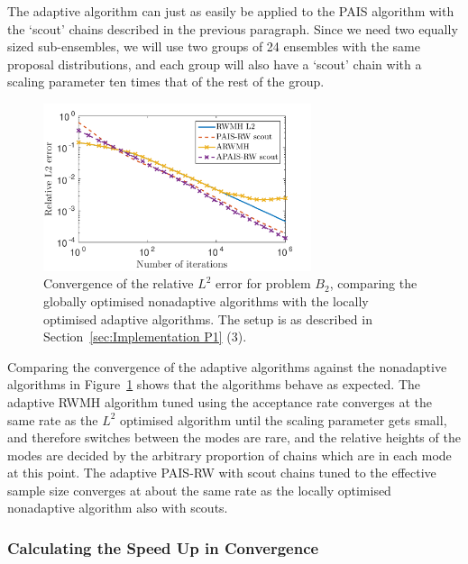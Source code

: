 \documentclass[final]{siamltex}
\begin{document}
The adaptive algorithm can just as easily be applied to the PAIS algorithm with the `scout' chains described in the previous paragraph. Since we need two equally sized sub-ensembles, we will use two groups of 24 ensembles with the same proposal distributions, and each group will also have a `scout' chain with a scaling parameter ten times that of the rest of the group.

\begin{figure}[htb]
\begin{center}
\includegraphics[width=0.7\textwidth]{"figures/BM2_AL2"}
\caption{Convergence of the relative $L^2$ error for problem $B_2$, comparing the globally optimised nonadaptive algorithms with the locally optimised adaptive algorithms. The setup is as described in Section~\ref{sec:Implementation P1} (3).}
\label{fig:BM2_AL2}
\end{center}
\end{figure}

Comparing the convergence of the adaptive algorithms against the
nonadaptive algorithms in Figure~\ref{fig:BM2_AL2} shows that the
algorithms behave as expected. The adaptive RWMH algorithm tuned using
the acceptance rate converges at the same rate as the $L^2$ optimised
algorithm until the scaling parameter gets small, and therefore
switches between the modes are rare, and the relative heights of the
modes are decided by the arbitrary proportion of chains which are in
each mode at this point. The adaptive PAIS-RW with scout chains tuned to the effective sample size converges at about the same rate as the locally optimised nonadaptive algorithm also with scouts.

\subsubsection{Calculating the Speed Up in Convergence}\label{sec:calc_saving}
\end{document}
